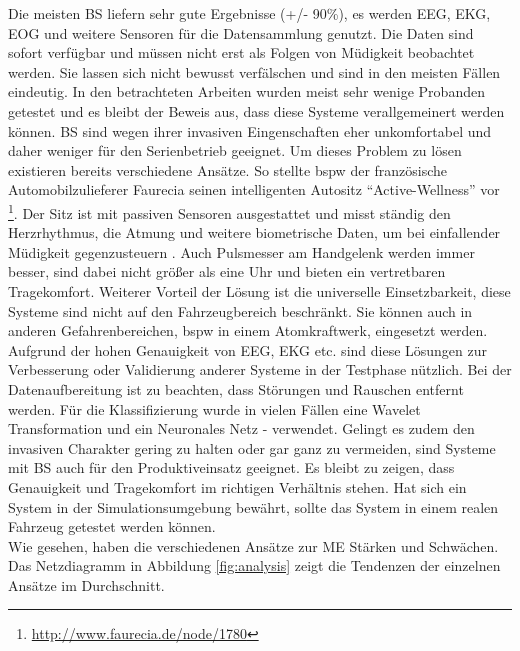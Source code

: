 {Die meisten \acl{BS} liefern sehr gute Ergebnisse (+/- 90\%), es werden EEG, EKG, EOG und weitere Sensoren für die Datensammlung genutzt. Die Daten sind sofort verfügbar und müssen nicht erst als Folgen von Müdigkeit beobachtet werden. Sie lassen sich nicht bewusst verfälschen und sind in den meisten Fällen eindeutig. In den betrachteten Arbeiten wurden meist sehr wenige Probanden getestet und es bleibt der Beweis aus, dass diese Systeme verallgemeinert werden können. \acl{BS} sind wegen ihrer invasiven Eingenschaften eher unkomfortabel und daher weniger für den Serienbetrieb geeignet. Um dieses Problem zu lösen existieren bereits verschiedene Ansätze. So stellte \acl{bspw} der französische Automobilzulieferer Faurecia seinen intelligenten Autositz "`Active-Wellness"' vor \footnote{\url{http://www.faurecia.de/node/1780}}. Der Sitz ist mit passiven Sensoren ausgestattet und misst ständig den Herzrhythmus, die Atmung und weitere biometrische Daten, um bei einfallender Müdigkeit gegenzusteuern . Auch Pulsmesser am Handgelenk werden immer besser, sind dabei nicht größer als eine Uhr und bieten ein vertretbaren Tragekomfort. 
Weiterer Vorteil der Lösung ist die universelle Einsetzbarkeit, diese Systeme sind nicht auf den Fahrzeugbereich beschränkt. Sie können auch in anderen Gefahrenbereichen, \acl{bspw} in einem Atomkraftwerk, eingesetzt werden. Aufgrund der hohen Genauigkeit von EEG, EKG etc. sind diese Lösungen zur Verbesserung oder Validierung anderer Systeme in der Testphase nützlich.
Bei der Datenaufbereitung ist zu beachten, dass Störungen und Rauschen entfernt werden. Für die Klassifizierung wurde in vielen Fällen eine Wavelet Transformation \cite{zhang_6513058}\cite{Khushaba_5580017}\cite{Subasi:2005:ARA:1707423.1707550} und ein Neuronales Netz \cite{wilson_890161} - \cite{Murthy_1} verwendet. Gelingt es zudem den invasiven Charakter gering zu halten oder gar ganz zu vermeiden, sind Systeme mit \acl{BS} auch für den Produktiveinsatz geeignet. Es bleibt zu zeigen, dass Genauigkeit und Tragekomfort im richtigen Verhältnis stehen. Hat sich ein System in der Simulationsumgebung bewährt, sollte das System in einem realen Fahrzeug getestet werden können.  \\

Wie gesehen, haben die verschiedenen Ansätze zur \acl{ME} Stärken und Schwächen. Das Netzdiagramm in Abbildung \ref{fig:analysis} zeigt die Tendenzen der einzelnen Ansätze im Durchschnitt.


}
